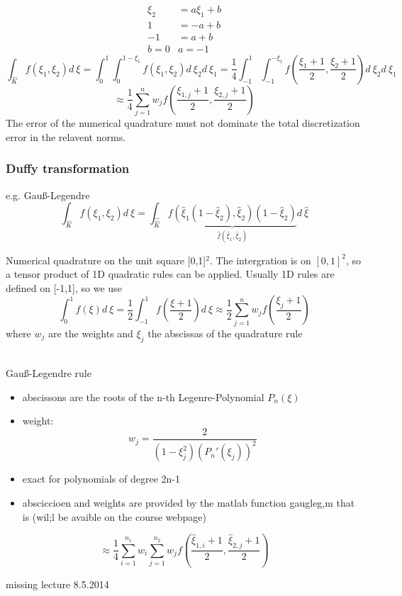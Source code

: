 \documentclass[english]{article}
\theoremstyle{definition}
\theoremstyle{remark}
\newcommand{\f}[2]{\frac{#1}{#2}}							%
\begin{document}

\begin{align*}
\xi_2&= a \xi_1 +b\\
1&= -a + b\\
-1&=a+b\\
b=0& a=-1
\end{align*}
$$\int_{\hat K} f(\xi_1,\xi_2) d\ \xi = \int_0 ^1 \int_0 ^{1-\xi_1} f(\xi_1,\xi_2)  d\ \xi_2 d\ \xi_1 =\f{1}{4} \int_{-1} ^1 \int _{-1} ^{-\xi_1} f(\f{\xi_1+1}{2} , \f{\xi_2+1}{2}) d\ \xi_2 d\ \xi_1$$
$$\approx \f{1}{4} \sum^n _{j=1} w_j f (\f{\xi_{1,j}+1}{2},\f{\xi_{2,j}+1}{2})$$
The error of the numerical quadrature must not dominate the total discretization error in the relavent norms.
\subsubsection{Duffy transformation}
e.g. Gau\ss{}-Legendre\\


$$\int_{\hat K} f(\xi_1,\xi_2) d\ \xi = \int_{\hat{\hat K}} \underbrace{f (\hat\xi_1(1-\hat\xi_2) , \hat\xi_2)(1-\hat\xi_2)}_{\hat f(\hat\xi_1,\hat\xi_2)} d\ \hat\xi$$

Numerical quadrature on the unit square [0,1]$^2$. The intergration is on $[0,1]^2$, so a tensor product of 1D quadratic rules can be applied. Usually 1D rules are defined on [-1,1], so we use 
$$\int_0 ^1 f(\xi) d\ \xi = \f{1}{2}\int_{-1} ^1 f(\f{\xi+1}{2}) d\ \xi \approx\f{1}{2} \sum_{j=1} ^n w_j f(\f{\xi_j +1}{2})$$
where $w_j$ are the weights and $\xi_j$ the abscissas of the quadrature rule

\\

Gau\ss{}-Legendre rule\\
\begin{itemize}
	\item abscissons are the roots of the n-th Legenre-Polynomial $P_n(\xi)$
	\item weight:
	$$w_j = \f{2}{(1-\xi_j ^2)(P_n'(\xi_j))^2}$$
	\item exact for polynomials of degree 2n-1
	\item absciccioen and weights are provided by the matlab function gaugleg,m that is (wil;l be avaible on the course webpage)
\end{itemize}
$$\approx \f{1}{4} \sum_{i=1}^{n_1} w_i \sum_{j=1}^{n_2} w_j f (\f{\hat\xi_{1,i}+1}{2},\f{\hat\xi_{2,j}+1}{2})$$
\printindex  %



missing lecture 8.5.2014
\end{document}
